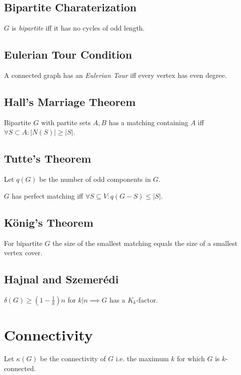 \subsection*{Bipartite Charaterization}

$G$ is \emph{bipartite} iff it has no cycles of odd length.

\subsection*{Eulerian Tour Condition}

A connected graph has an \emph{Eulerian Tour} iff every vertex has even degree.

\subsection*{Hall's Marriage Theorem}

Bipartite $G$ with partite sets $A, B$ has a matching containing $A$ iff $\forall S \subset A : |N(S)|\geq|S|$.

\subsection*{Tutte's Theorem}

Let $q(G)$ be the number of odd components in $G$.

$G$ has perfect matching iff $\forall S \subseteq V : q(G-S) \leq |S|$.

\subsection*{König's Theorem}

For bipartite $G$ the size of the smallest matching equals the size of a smallest vertex cover.

\subsection*{Hajnal and Szemer\'{e}di}

$\delta(G) \geq (1-\frac{1}{k})n$ for $k | n \implies G$ has a $K_k$-factor.

\section*{Connectivity}

Let $\kappa(G)$ be the connectivity of $G$ i.e. the maximum $k$ for which $G$ is $k$-connected.

